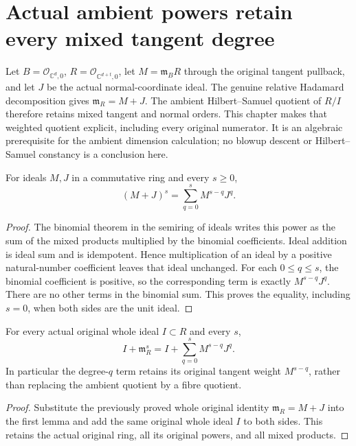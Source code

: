 \section{Actual ambient powers retain every mixed tangent degree}

Let $B=\mathcal O_{\mathbb C^d,0}$, $R=\mathcal O_{\mathbb C^{d+t},0}$,
let $M=\mathfrak m_B R$ through the original tangent pullback, and let
$J$ be the actual normal-coordinate ideal. The genuine relative Hadamard
decomposition gives $\mathfrak m_R=M+J$. The ambient Hilbert--Samuel
quotient of $R/I$ therefore retains mixed tangent and normal orders.
This chapter makes that weighted quotient explicit, including every
original numerator. It is an algebraic prerequisite for the ambient
dimension calculation; no blowup descent or Hilbert--Samuel constancy
is a conclusion here.

\begin{lemma}
\label{hir:relative-normal-whole-mixed-ideal-power-expansion}
\leanok
For ideals $M,J$ in a commutative ring and every $s\geq0$,
\[
 (M+J)^s=\sum_{q=0}^s M^{s-q}J^q.
\]
\end{lemma}
\begin{proof}
The binomial theorem in the semiring of ideals writes this power as
the sum of the mixed products multiplied by the binomial coefficients.
Ideal addition is ideal sum and is idempotent. Hence multiplication
of an ideal by a positive natural-number coefficient leaves that
ideal unchanged. For each $0\leq q\leq s$, the binomial coefficient
is positive, so the corresponding term is exactly $M^{s-q}J^q$.
There are no other terms in the binomial sum. This proves the equality,
including $s=0$, when both sides are the unit ideal.
\end{proof}

\begin{theorem}
\label{hir:relative-normal-original-ambient-mixed-maximal-power}
\leanok
For every actual original whole ideal $I\subset R$ and every $s$,
\[
 I+\mathfrak m_R^s=I+\sum_{q=0}^s M^{s-q}J^q.
\]
In particular the degree-$q$ term retains its original tangent weight
$M^{s-q}$, rather than replacing the ambient quotient by a fibre quotient.
\end{theorem}
\begin{proof}
Substitute the previously proved whole original identity
$\mathfrak m_R=M+J$ into the first lemma and add the same original
whole ideal $I$ to both sides. This retains the actual original ring,
all its original powers, and all mixed products.
\end{proof}

